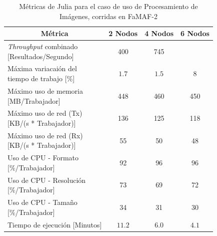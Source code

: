 \documentclass[11pt]{article}
\providecommand{\row}[1]{\parbox{150pt}{\setlength{\baselineskip}{0.2\baselineskip}\strut#1\strut}}
\newcommand{\ipcap}[2]{\caption{Métricas de #1 para el caso de uso de Procesamiento de Imágenes, corridas en #2}}
\newcommand{\english}[1]{\textit{#1}}
\begin{document}
\begin{table}[H]
\centering
\begin{tabular}{|l|c|c|c|}
\hline
\multicolumn{1}{|c|}{Métrica} & 2 Nodos & 4 Nodos & 6 Nodos \\ \hline
\row{\english{Throughput} combinado\\{[Resultados/Segundo]}} & 400 & 745 &  \\ \hline
\row{Máxima variacaión del \\ tiempo de trabajo {[}\%{]}} & $1.7$ & $1.5$ & 8 \\ \hline
\row{Máximo uso de memoria \\ {[MB/Trabajador]}} & 448 & 460 & 450 \\ \hline
\row{Máximo uso de red (Tx) \\ {[KB/(s * Trabajador)]}} & 136 & 125 & 118 \\ \hline
\row{Máximo uso de red (Rx) \\ {[KB/(s * Trabajador)]}} & 55 & 50 & 48 \\ \hline
\row{Uso de CPU - Formato\\{[\%/Trabajador]}} & 92 & 96 & 96 \\ \hline
\row{Uso de CPU - Resolución\\{[\%/Trabajador]}} & 73 & 69 & 72 \\ \hline
\row{Uso de CPU - Tamaño\\{[\%/Trabajador]}} & 34 & 31 & 30 \\ \hline
Tiempo de ejecución [Minutos] & $11.2$ & $6.0$ & $4.1$ \\ \hline
\end{tabular}
\ipcap{Julia}{FaMAF-2}
\end{table}
\end{document}
